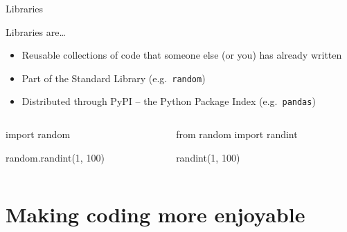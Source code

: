 \begin{frame}[fragile]{Libraries}
    \begin{block}{Libraries are\ldots}
        \begin{itemize}
            \item Reusable collections of code that someone else (or you) has
                  already written
            \item Part of the Standard Library
                  (e.g.\ \texttt{random})
            \item Distributed through PyPI -- the Python Package Index
                  (e.g.\ \texttt{pandas})
        \end{itemize}
    \end{block}
    \vfill
    \begin{columns}
        \begin{column}{0.5\textwidth}
            \begin{py3}
                import random

                random.randint(1, 100)
            \end{py3}
        \end{column}
        \begin{column}{0.5\textwidth}
            \begin{py3}
                from random import randint

                randint(1, 100)
            \end{py3}
        \end{column}
    \end{columns}
\end{frame}

\section{Making coding more enjoyable}

